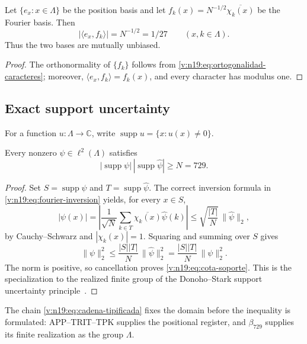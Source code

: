\begin{lemma}
\label{v:n19:lem:mub}
Let \(\{e_x:x\in\Lambda\}\) be the position basis and let
\(f_k(x)=N^{-1/2}\overline{\chi_k(x)}\) be the Fourier basis. Then
\begin{equation}
 |\langle e_x,f_k\rangle|=N^{-1/2}=1/27
 \qquad(x,k\in\Lambda).
 \label{v:n19:eq:mub}
\end{equation}
Thus the two bases are mutually unbiased.
\end{lemma}
\begin{proof}
The orthonormality of \(\{f_k\}\) follows from
\eqref{v:n19:eq:ortogonalidad-caracteres}; moreover,
\(\langle e_x,f_k\rangle=f_k(x)\), and every character has modulus one.
\end{proof}

\subsection{Exact support uncertainty}
\label{v:n19:sec:soporte}

For a function \(u:\Lambda\to\mathbb C\), write
\(\operatorname{supp}u=\{x:u(x)\ne0\}\).

\begin{theorem}
\label{v:n19:thm:soporte}
Every nonzero \(\psi\in\ell^2(\Lambda)\) satisfies
\begin{equation}
 |\operatorname{supp}\psi|\,
 |\operatorname{supp}\widehat\psi|\ge N=729.
 \label{v:n19:eq:cota-soporte}
\end{equation}
\end{theorem}
\begin{proof}
Set \(S=\operatorname{supp}\psi\) and
\(T=\operatorname{supp}\widehat\psi\). The correct inversion formula in
\eqref{v:n19:eq:fourier-inversion} yields, for every \(x\in S\),
\[
 |\psi(x)|
 =\left|\frac1{\sqrt N}\sum_{k\in T}
       \overline{\chi_k(x)}\widehat\psi(k)\right|
 \le \sqrt{\frac{|T|}{N}}\,\|\widehat\psi\|_2,
\]
by Cauchy--Schwarz and \(|\chi_k(x)|=1\). Squaring and summing over
\(S\) gives
\[
 \|\psi\|_2^2
 \le\frac{|S||T|}{N}\,\|\widehat\psi\|_2^2
 =\frac{|S||T|}{N}\,\|\psi\|_2^2.
\]
The norm is positive, so cancellation proves
\eqref{v:n19:eq:cota-soporte}. This is the specialization to the realized
finite group of the Donoho--Stark support uncertainty
principle~\cite{donoho_stark_1989}.
\end{proof}

The chain \eqref{v:n19:eq:cadena-tipificada} fixes the domain before the
inequality is formulated: APP--TRIT--TPK supplies the positional register,
and \(\beta_{729}\) supplies its finite realization as the group
\(\Lambda\).

